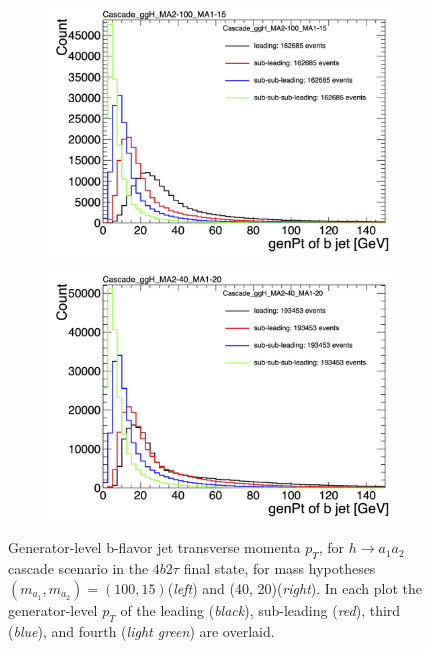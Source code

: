 \begin{figure}[ht]
    \centering
    \begin{subfigure}{0.45\textwidth}
        \includegraphics[width=1.0\textwidth]{figures/ch-11-asymmetric/Cascade_ggH_MA2-100_MA1-15_overlay}
    \end{subfigure}
    \hfill
    \begin{subfigure}{0.45\textwidth}
        \includegraphics[width=1.0\textwidth]{figures/ch-11-asymmetric/Cascade_ggH_MA2-40_MA1-20_overlay}
    \end{subfigure}  
    \caption{Generator-level b-flavor jet transverse momenta $p_{T}$, for $h \rightarrow a_1 a_2$ cascade scenario in the $4b2\tau$ final state, for mass hypotheses $(m_{a_1}, m_{a_2}) = (100, 15)$\GeV (\textit{left}) and (40, 20)\GeV (\textit{right}). In each plot the generator-level $p_{T}$ of the leading (\textit{black}), sub-leading (\textit{red}), third (\textit{blue}), and fourth (\textit{light green}) are overlaid.}
    \label{fig:overlay_cascade_b_jet_gen_pT}
\end{figure}


